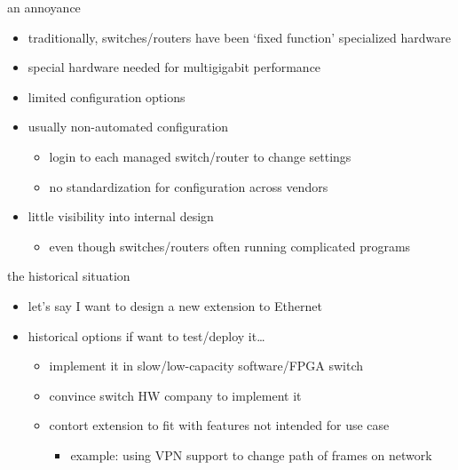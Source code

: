 \begin{frame}{an annoyance}
    \begin{itemize}
    \item traditionally, switches/routers have been `fixed function' specialized hardware
    \vspace{.5cm}
    \item special hardware needed for multigigabit performance
    \item limited configuration options
    \item usually non-automated configuration
        \begin{itemize}
        \item login to each managed switch/router to change settings
        \item no standardization for configuration across vendors
        \end{itemize}
    \item little visibility into internal design
        \begin{itemize}
        \item even though switches/routers often running complicated programs
        \end{itemize}
    \end{itemize}
\end{frame}

\begin{frame}{the historical situation}
    \begin{itemize}
    \item let's say I want to design a new extension to Ethernet
    \vspace{.5cm}
    \item historical options if want to test/deploy it\ldots
        \begin{itemize}
        \item implement it in slow/low-capacity software/FPGA switch
        \vspace{.5cm}
        \item convince switch HW company to implement it
        \vspace{.5cm}
        \item contort extension to fit with features not intended for use case
            \begin{itemize}
            \item example: using VPN support to change path of frames on network
            \end{itemize}
        \end{itemize}
    \end{itemize}
\end{frame}

